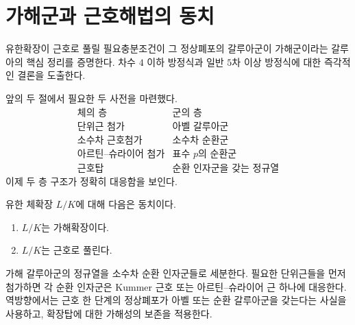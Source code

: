 \clearpage
\section{가해군과 근호해법의 동치}
\label{sec:solvability-radicals-theorem}

\begin{learninggoal}
유한확장이 근호로 풀릴 필요충분조건이 그 정상폐포의 갈루아군이 가해군이라는 갈루아의 핵심 정리를 증명한다. 차수 $4$ 이하 방정식과 일반 $5$차 이상 방정식에 대한 즉각적인 결론을 도출한다.
\end{learninggoal}

앞의 두 절에서 필요한 두 사전을 마련했다.
\[
\begin{array}{c|c}
\text{체의 층} & \text{군의 층}\\
\hline
\text{단위근 첨가} & \text{아벨 갈루아군}\\
\text{소수차 근호첨가} & \text{소수차 순환군}\\
\text{아르틴--슈라이어 첨가} & \text{표수 }p\text{의 순환군}\\
\text{근호탑} & \text{순환 인자군을 갖는 정규열}
\end{array}
\]
이제 두 층 구조가 정확히 대응함을 보인다.

\begin{theorem}
\label{thm:solvable-iff-radicals}
유한 체확장 $L/K$에 대해 다음은 동치이다.
\begin{enumerate}[label=(\roman*)]
  \item $L/K$는 가해확장이다.
  \item $L/K$는 근호로 풀린다.
\end{enumerate}
\end{theorem}

\begin{proofidea}
가해 갈루아군의 정규열을 소수차 순환 인자군들로 세분한다. 필요한 단위근들을 먼저 첨가하면 각 순환 인자군은 Kummer 근호 또는 아르틴--슈라이어 근 하나에 대응한다. 역방향에서는 근호 한 단계의 정상폐포가 아벨 또는 순환 갈루아군을 갖는다는 사실을 사용하고, 확장탑에 대한 가해성의 보존을 적용한다.
\end{proofidea}

